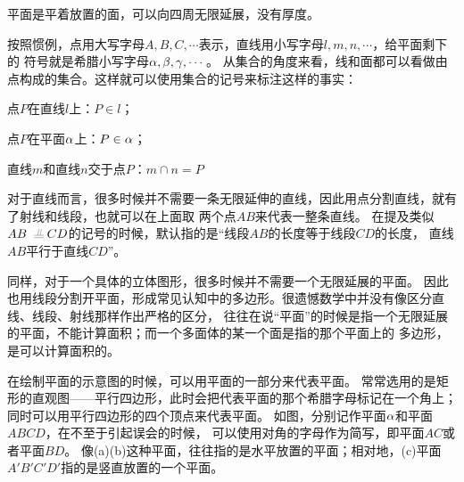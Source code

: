 \begin{definition}[平面]
    平面是平着放置的面，可以向四周无限延展，没有厚度。
\end{definition}

按照惯例，点用大写字母\(A,B,C,\cdots\)表示，直线用小写字母\(l,m,n,\cdots\)，给平面剩下的
符号就是希腊小写字母\(\aa,\bb,\gamma,\cdots\)。
从集合的角度来看，线和面都可以看做由点构成的集合。这样就可以使用集合的记号来标注这样的事实：
\begin{center}
    点$P$在直线$l$上：\(P\in l\)；

    点$P$在平面\(\aa\)上：\(P\in \aa\)；
    
    直线$m$和直线$n$交于点$P$：\(m\cap n=P\)   
\end{center}



对于直线而言，很多时候并不需要一条无限延伸的直线，因此用点分割直线，就有了射线和线段，也就可以在上面取
两个点\(AB\)来代表一整条直线。
在提及类似\(AB\pxqdy CD\)的记号的时候，默认指的是“线段\(AB\)的长度等于线段\(CD\)的长度，
直线\(AB\)平行于直线\(CD\)”。

同样，对于一个具体的立体图形，很多时候并不需要一个无限延展的平面。
因此也用线段分割开平面，形成常见认知中的多边形。很遗憾数学中并没有像区分直线、线段、射线那样作出严格的区分，
往往在说“平面”的时候是指一个无限延展的平面，不能计算面积；而一个多面体的某一个面是指的那个平面上的
多边形，是可以计算面积的。

在绘制平面的示意图的时候，可以用平面的一部分来代表平面。
常常选用的是矩形的直观图——平行四边形，此时会把代表平面的那个希腊字母标记在一个角上；
同时可以用平行四边形的四个顶点来代表平面。
如图，分别记作平面\(\aa\)和平面\(ABCD\)，在不至于引起误会的时候，
可以使用对角的字母作为简写，即平面\(AC\)或者平面\(BD\)。
像(a)(b)这种平面，往往指的是水平放置的平面；相对地，(c)平面\(A'B'C'D'\)指的是竖直放置的一个平面。

